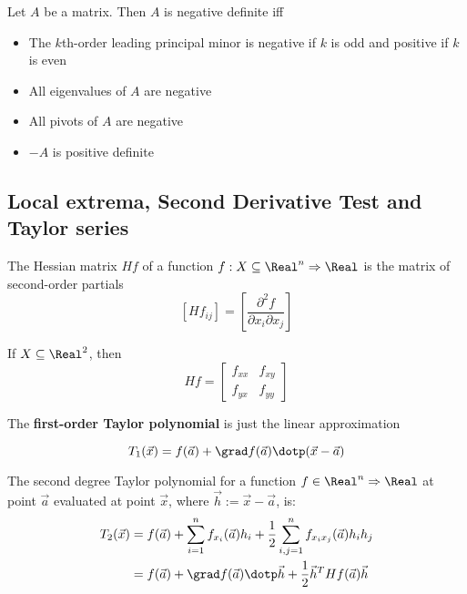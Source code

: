 \begin{theorem}
  Let $A$ be a matrix. Then $A$ is negative definite iff
  \begin{itemize}
    \item The $k$th-order leading principal minor is negative if $k$ is odd and positive if $k$ is even
    \item All eigenvalues of $A$ are negative
    \item All pivots of $A$ are negative
    \item $-A$ is positive definite
  \end{itemize}
\end{theorem}

\subsection{Local extrema, Second Derivative Test and Taylor series}


\begin{definition}
  The Hessian matrix $Hf$ of a function $f : X \subseteq \Real^n \Rightarrow \Real$ is the matrix of second-order partials
  \[
    \left[Hf_{ij}\right] = \left[\frac{\partial^2 f}{\partial x_i \partial x_j}\right]
  \]

  If $X \subseteq \Real^2$, then
  \[
    Hf = \begin{bmatrix}
      f_{xx} & f_{xy} \\
      f_{yx} & f_{yy}
    \end{bmatrix}
  \]
\end{definition}

The \textbf{first-order Taylor polynomial} is just the linear approximation

\[
  T_1(\vec{x}) = f(\vec{a}) + \grad f(\vec{a}) \dotp (\vec{x} - \vec{a})
\]

\begin{definition}
  The second degree Taylor polynomial for a function $f \in \Real^n \Rightarrow \Real$ at point $\vec{a}$ evaluated at point $\vec{x}$, where $\vec{h} := \vec{x} - \vec{a}$, is:
  \begin{align*}
    T_2(\vec{x}) &= f(\vec{a}) + \sum_{i = 1}^n f_{x_i}(\vec{a}) h_i + \frac{1}{2} \sum_{i,j=1}^n f_{x_i x_j}(\vec{a}) h_i h_j \\
    &= f(\vec{a}) + \grad f(\vec{a}) \dotp \vec{h} + \frac{1}{2} \vec{h}^T Hf(\vec{a}) \vec{h}
  \end{align*}
\end{definition}

